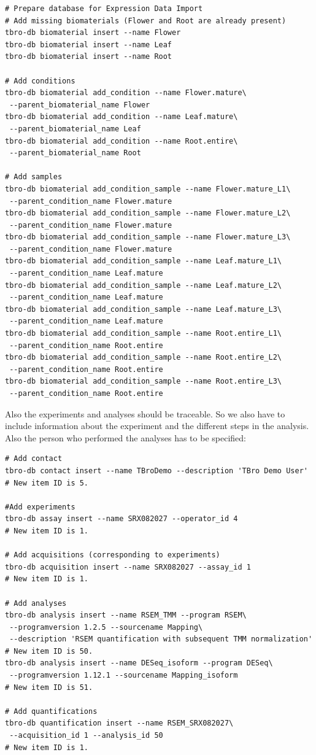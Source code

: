 \documentclass[english]{scrartcl}
\begin{document}
\begin{lstlisting}
# Prepare database for Expression Data Import
# Add missing biomaterials (Flower and Root are already present)
tbro-db biomaterial insert --name Flower
tbro-db biomaterial insert --name Leaf
tbro-db biomaterial insert --name Root

# Add conditions
tbro-db biomaterial add_condition --name Flower.mature\
 --parent_biomaterial_name Flower
tbro-db biomaterial add_condition --name Leaf.mature\
 --parent_biomaterial_name Leaf
tbro-db biomaterial add_condition --name Root.entire\
 --parent_biomaterial_name Root

# Add samples
tbro-db biomaterial add_condition_sample --name Flower.mature_L1\
 --parent_condition_name Flower.mature
tbro-db biomaterial add_condition_sample --name Flower.mature_L2\
 --parent_condition_name Flower.mature
tbro-db biomaterial add_condition_sample --name Flower.mature_L3\
 --parent_condition_name Flower.mature
tbro-db biomaterial add_condition_sample --name Leaf.mature_L1\
 --parent_condition_name Leaf.mature
tbro-db biomaterial add_condition_sample --name Leaf.mature_L2\
 --parent_condition_name Leaf.mature
tbro-db biomaterial add_condition_sample --name Leaf.mature_L3\
 --parent_condition_name Leaf.mature
tbro-db biomaterial add_condition_sample --name Root.entire_L1\
 --parent_condition_name Root.entire
tbro-db biomaterial add_condition_sample --name Root.entire_L2\
 --parent_condition_name Root.entire
tbro-db biomaterial add_condition_sample --name Root.entire_L3\
 --parent_condition_name Root.entire
\end{lstlisting}

Also the experiments and analyses should be traceable. So we also have to
include information about the experiment and the different steps in the
analysis. Also the person who performed the analyses has to be specified:

\begin{lstlisting}
# Add contact
tbro-db contact insert --name TBroDemo --description 'TBro Demo User' 
# New item ID is 5.

#Add experiments 
tbro-db assay insert --name SRX082027 --operator_id 4
# New item ID is 1.

# Add acquisitions (corresponding to experiments)
tbro-db acquisition insert --name SRX082027 --assay_id 1
# New item ID is 1.

# Add analyses 
tbro-db analysis insert --name RSEM_TMM --program RSEM\
 --programversion 1.2.5 --sourcename Mapping\
 --description 'RSEM quantification with subsequent TMM normalization'
# New item ID is 50.
tbro-db analysis insert --name DESeq_isoform --program DESeq\
 --programversion 1.12.1 --sourcename Mapping_isoform
# New item ID is 51.

# Add quantifications
tbro-db quantification insert --name RSEM_SRX082027\
 --acquisition_id 1 --analysis_id 50
# New item ID is 1.
\end{lstlisting}
\end{document}

